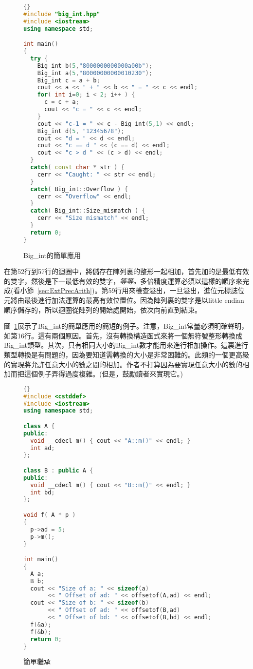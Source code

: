 \begin{figure}[tp]
\begin{lstlisting}[language=C++, frame=tlrb]{}
#include "big_int.hpp"
#include <iostream>
using namespace std;

int main()
{
  try {
    Big_int b(5,"8000000000000a00b");
    Big_int a(5,"80000000000010230");
    Big_int c = a + b;
    cout << a << " + " << b << " = " << c << endl;
    for( int i=0; i < 2; i++ ) {
      c = c + a;
      cout << "c = " << c << endl;
    }
    cout << "c-1 = " << c - Big_int(5,1) << endl;
    Big_int d(5, "12345678");
    cout << "d = " << d << endl;
    cout << "c == d " << (c == d) << endl;
    cout << "c > d " << (c > d) << endl;
  }
  catch( const char * str ) {
    cerr << "Caught: " << str << endl;
  }
  catch( Big_int::Overflow ) {
    cerr << "Overflow" << endl;
  }
  catch( Big_int::Size_mismatch ) {
    cerr << "Size mismatch" << endl;
  }
  return 0;
}
\end{lstlisting}
\caption{ {\code Big\_int}的簡單應用 \label{fig:BigIntEx}}
\end{figure}

在第52行到57行的迴圈中，將儲存在陣列裏的整形一起相加，首先加的是最低有效的雙字，然後是下一最低有效的雙字，\emph{等等。}多倍精度運算必須以這樣的順序來完成(看小節~\ref{sec:ExtPrecArith})。第59行用來檢查溢出，一旦溢出，進位元標誌位元將由最後進行加法運算的最高有效位置位。因為陣列裏的雙字是以little endian順序儲存的，所以迴圈從陣列的開始處開始，依次向前直到結束。

圖~\ref{fig:BigIntEx}展示了{\code Big\_int}的簡單應用的簡短的例子。注意，{\code Big\_int}常量必須明確聲明，如第16行。這有兩個原因。首先，沒有轉換構造函式來將一個無符號整形轉換成{\code Big\_int}類型。其次，只有相同大小的{\code Big\_int}數才能用來進行相加操作。這裏進行類型轉換是有問題的，因為要知道需轉換的大小是非常困難的。此類的一個更高級的實現將允許任意大小的數之間的相加。作者不打算因為要實現任意大小的數的相加而把這個例子弄得過度複雜。(但是，鼓勵讀者來實現它。)

\begin{figure}[tp]
\begin{lstlisting}[language=C++, frame=tlrb]{}
#include <cstddef>
#include <iostream>
using namespace std;

class A {
public:
  void __cdecl m() { cout << "A::m()" << endl; }
  int ad;
};

class B : public A {
public:
  void __cdecl m() { cout << "B::m()" << endl; }
  int bd;
};

void f( A * p )
{
  p->ad = 5;
  p->m();
}

int main()
{
  A a;
  B b;
  cout << "Size of a: " << sizeof(a)
       << " Offset of ad: " << offsetof(A,ad) << endl;
  cout << "Size of b: " << sizeof(b)
       << " Offset of ad: " << offsetof(B,ad)
       << " Offset of bd: " << offsetof(B,bd) << endl;
  f(&a);
  f(&b);
  return 0;
}
\end{lstlisting}
\caption{簡單繼承\label{fig:SimpInh}}
\end{figure}


